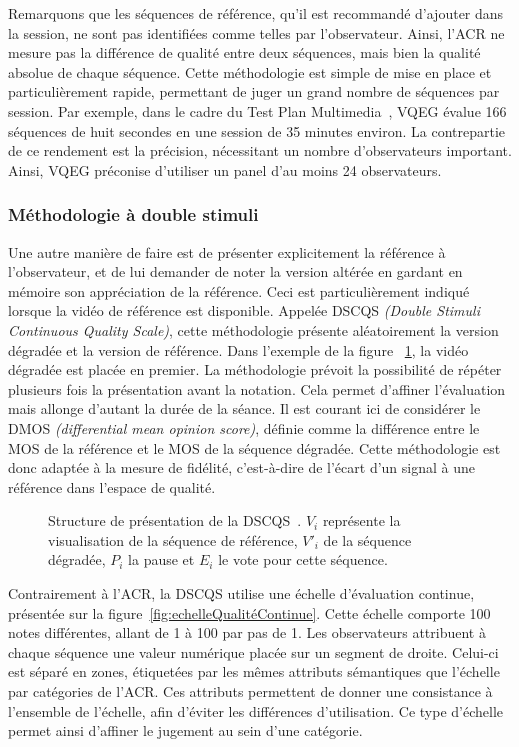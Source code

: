 Remarquons que les séquences de référence, qu'il est recommandé d'ajouter dans la session, ne sont pas identifiées comme telles par l'observateur. Ainsi, l'ACR ne mesure pas la différence de qualité entre deux séquences, mais bien la qualité absolue de chaque séquence. Cette méthodologie est simple de mise en place et particulièrement rapide, permettant de juger un grand nombre de séquences par session. Par exemple, dans le cadre du Test Plan Multimedia~\cite{vqeg-MMtestplan}, VQEG évalue 166 séquences de huit secondes en une session de 35 minutes environ. La contrepartie de ce rendement est la précision, nécessitant un nombre d'observateurs important. Ainsi, VQEG préconise d'utiliser un panel d'au moins 24 observateurs.


\subsubsection{Méthodologie à double stimuli} \label{tests:dscqs}
Une autre manière de faire est de présenter explicitement la référence à l'observateur, et de lui demander de noter la version altérée en gardant en mémoire son appréciation de la référence. Ceci est particulièrement indiqué lorsque la vidéo de référence est disponible. Appelée DSCQS \emph{(Double Stimuli Continuous Quality Scale)}, cette méthodologie présente aléatoirement la version dégradée et la version de référence. Dans l'exemple de la figure ~\ref{fig:dscqs}, la vidéo dégradée est placée en premier. La méthodologie prévoit la possibilité de répéter plusieurs fois la présentation avant la notation. Cela permet d'affiner l'évaluation mais allonge d'autant la durée de la séance. Il est courant ici de considérer le DMOS \emph{(differential mean opinion score)}, définie comme la différence entre le MOS de la référence et le MOS de la séquence dégradée. Cette méthodologie est donc adaptée à la mesure de fidélité, c'est-à-dire de l'écart d'un signal à une référence dans l'espace de qualité.

\begin{figure}[htbp]
  \centering
  
  \caption{Structure de présentation de la DSCQS~\cite{itu-bt500-11}. $V_i$ représente la visualisation de la séquence de référence, $V'_i$ de la séquence dégradée, $P_i$ la pause et $E_i$ le vote pour cette séquence.}
  \label{fig:dscqs}
\end{figure}

Contrairement à l'ACR, la DSCQS utilise une échelle d'évaluation continue, présentée sur la figure~\ref{fig:echelleQualitéContinue}. Cette échelle comporte 100 notes différentes, allant de 1 à 100 par pas de 1. Les observateurs attribuent à chaque séquence une valeur numérique placée sur un segment de droite. Celui-ci est séparé en zones, étiquetées par les mêmes attributs sémantiques que l'échelle par catégories de l'ACR. Ces attributs permettent de donner une consistance à l'ensemble de l'échelle, afin d'éviter les différences d'utilisation. Ce type d'échelle permet ainsi d'affiner le jugement au sein d'une catégorie.

